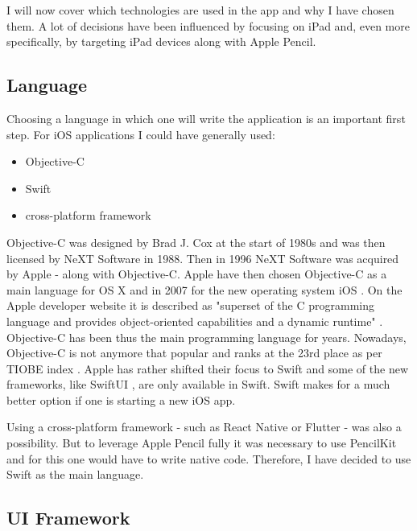 I will now cover which technologies are used in the app and why I have chosen them. A lot of decisions have been influenced by focusing on iPad and, even more specifically, by targeting iPad devices along with Apple Pencil. 

\subsection{Language}

Choosing a language in which one will write the application is an important first step. For iOS applications I could have generally used:
\begin{itemize}
    \item Objective-C
    \item Swift
    \item cross-platform framework
\end{itemize}

Objective-C was designed by Brad J. Cox at the start of 1980s and was then licensed by NeXT Software in 1988. Then in 1996 NeXT Software was acquired by Apple - along with Objective-C. Apple have then chosen Objective-C as a main language for OS X and in 2007 for the new operating system iOS \cite{objective-c-programming}. On the Apple developer website it is described as "superset of the C programming language and provides object-oriented capabilities and a dynamic runtime" \cite{objective-c}. Objective-C has been thus the main programming language for years. Nowadays, Objective-C is not anymore that popular and ranks at the 23rd place as per TIOBE index \cite{tiobe-index}. Apple has rather shifted their focus to Swift and some of the new frameworks, like SwiftUI \cite{swiftui}, are only available in Swift. Swift makes for a much better option if one is starting a new iOS app.

Using a cross-platform framework - such as React Native \cite{react-native} or Flutter \cite{flutter} - was also a possibility. But to leverage Apple Pencil fully it was necessary to use PencilKit \cite{pencilkit} and for this one would have to write native code. Therefore, I have decided to use Swift as the main language.

\subsection{UI Framework}

